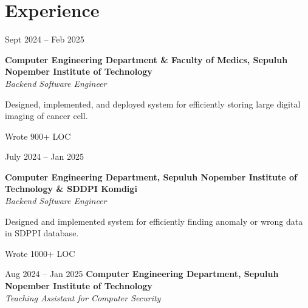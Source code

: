 \section{Experience}

    \begin{twocolentry}{
        Sept 2024 – Feb 2025
    }

    \textbf{Computer Engineering Department \& Faculty of Medics, Sepuluh Nopember Institute of Technology}\\
    \textit{Backend Software Engineer}
    \end{twocolentry}

    \vspace{0.10 cm}
    \begin{onecolentry}
        \begin{highlights}
            \item Designed, implemented, and deployed system for efficiently storing large digital imaging of cancer cell.
            \item Wrote 900+ LOC
        \end{highlights}
    \end{onecolentry}

    \vspace{0.2 cm}

    \begin{twocolentry}{
        July 2024 – Jan 2025
    }

    \textbf{Computer Engineering Department, Sepuluh Nopember Institute of Technology \& SDDPI Komdigi}\\
    \textit{Backend Software Engineer}
    \end{twocolentry}

    \vspace{0.10 cm}
    \begin{onecolentry}
        \begin{highlights}
            \item Designed and implemented system for efficiently finding anomaly or wrong data in SDPPI database.
            \item Wrote 1000+ LOC
        \end{highlights}
    \end{onecolentry}

    \vspace{0.2 cm}

    \begin{twocolentry}{
        Aug 2024 – Jan 2025
    }
    \textbf{Computer Engineering Department, Sepuluh Nopember Institute of Technology}\\
    \textit{Teaching Assistant for Computer Security}
    \end{twocolentry}

